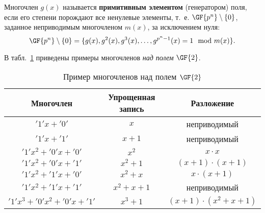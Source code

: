 Многочлен $g(x)$ называется \textbf{примитивным элементом} (генератором) поля, если его степени порождают все ненулевые элементы, т.~е. $\GF{p^n} \setminus \{0\}$, заданное неприводимым многочленом $m(x)$, за исключением нуля:
    \[ \GF{p^n} \setminus \{0\} = \{ g(x), g^2(x), g^3(x), \dots, g^{p^n-1}(x) = 1 \mod m(x) \}. \]

\example
В табл.~\ref{tab:irreducible-gf2} приведены примеры многочленов \emph{над полем} $\GF{2}$.
\begin{table}[!ht]
    \centering
    \caption{Пример многочленов над полем $\GF{2}$\label{tab:irreducible-gf2}}
    \begin{tabular}{|c|c|c|}
        \hline
        Многочлен & \parbox{2.5cm}{Упрощенная запись} & Разложение \\
        \hline
        $'1' x + '0'$ & $x$ & неприводимый \\
        $'1' x + '1'$ & $x+1$ & неприводимый \\
        $'1' x^2 + '0' x + '0'$ & $x^2$ & $x \cdot x$ \\
        $'1' x^2 + '0'x + '1'$ & $x^2 + 1$ & $(x+1) \cdot (x+1)$ \\
        $'1' x^2 + '1' x + '0'$ & $x^2 + x$ & $x \cdot (x+1)$ \\
        $'1' x^2 + '1' x + '1'$ & $x^2 + x + 1$ & неприводимый \\
        $'1' x^3 + '0' x^2 + '0' x + '1'$ & $x^3 + 1$ & $(x+1) \cdot (x^2+x+1)$ \\
        \hline
    \end{tabular}
\end{table}
\exampleend
